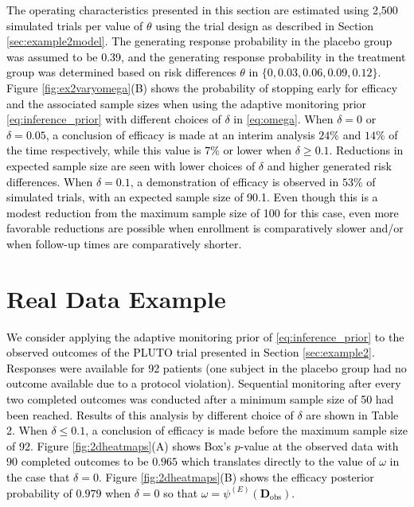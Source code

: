 \documentclass[12pt]{article}
\begin{document}
\textcolor{black}{
The operating characteristics presented in this section are estimated using 2,500 simulated trials per value of $\theta$ using the trial design as described in Section \ref{sec:example2model}. The generating response probability in the placebo group was assumed to be 0.39, and the generating response probability in the treatment group was determined based on risk differences $\theta$ in $\{0, 0.03, 0.06, 0.09, 0.12\}$. Figure \ref{fig:ex2varyomega}(B) shows the probability of stopping early for efficacy and the associated sample sizes when using the adaptive monitoring prior \eqref{eq:inference_prior} with different choices of $\delta$ in \eqref{eq:omega}. When $\delta=0$ or $\delta=0.05$, a conclusion of efficacy is made at an interim analysis $24\%$ and $14\%$ of the time respectively, while this value is $7\%$ or lower when $\delta \geq 0.1$. Reductions in expected sample size are seen with lower choices of $\delta$ and higher generated risk differences. When $\delta=0.1$, a demonstration of efficacy is observed in $53\%$ of simulated trials, with an expected sample size of 90.1. Even though this is a modest reduction from the maximum sample size of 100 for this case, even more favorable reductions are possible when enrollment is comparatively slower and/or when follow-up times are comparatively shorter.}

\section{Real Data Example}\label{sec:realdataexample}
\textcolor{black}{
We consider applying the adaptive monitoring prior of \eqref{eq:inference_prior} to the observed outcomes of the PLUTO trial presented in Section \ref{sec:example2}. %
Responses were available for 92 patients (one subject in the placebo group had no outcome available due to a protocol violation). Sequential monitoring after every two completed outcomes was conducted after a minimum sample size of 50 had been reached. Results of this analysis by different choice of $\delta$ are shown in Table 2. When $\delta\leq 0.1$, a conclusion of efficacy is made before the maximum sample size of 92. Figure \ref{fig:2dheatmaps}(A) shows Box's $p$-value at the observed data with $90$ completed outcomes to be $0.965$ which translates directly to the value of $\omega$ in the case that $\delta=0$. Figure \ref{fig:2dheatmaps}(B) shows the efficacy posterior probability of $0.979$ when $\delta=0$ so that $\omega=\psi^{(E)}(\mathbf{D}_{\text{obs}})$.} 
\end{document}
